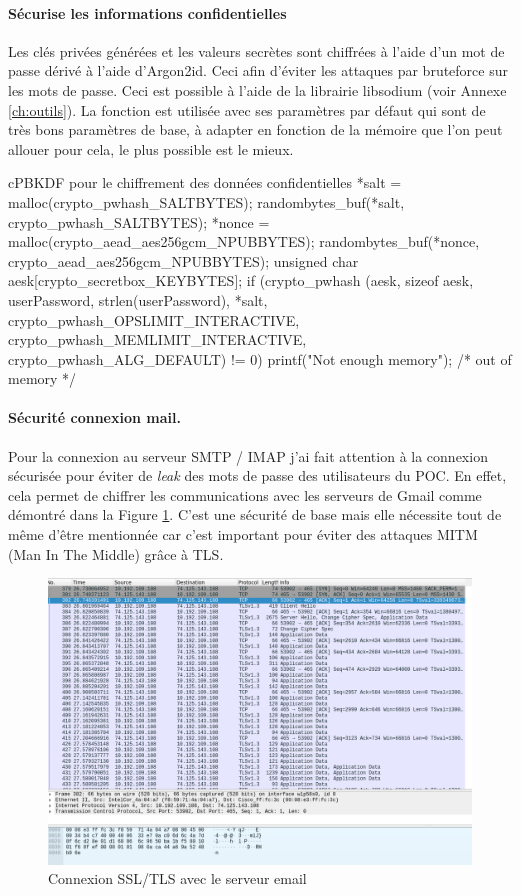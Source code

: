 \paragraph*{Sécurise les informations confidentielles}
Les clés privées générées et les valeurs secrètes sont chiffrées à l'aide d'un mot de passe dérivé à l'aide d'Argon2id. Ceci afin d'éviter les attaques par bruteforce sur les mots de passe. Ceci est possible à l'aide de la librairie libsodium (voir Annexe \ref{ch:outils}). La fonction est utilisée avec ses paramètres par défaut qui sont de très bons paramètres de base, à adapter en fonction de la mémoire que l'on peut allouer pour cela, le plus possible est le mieux.
\begin{sourcebox}{c}{PBKDF pour le chiffrement des données confidentielles}
	*salt = malloc(crypto_pwhash_SALTBYTES);
	randombytes_buf(*salt, crypto_pwhash_SALTBYTES);
	*nonce = malloc(crypto_aead_aes256gcm_NPUBBYTES);
	randombytes_buf(*nonce, crypto_aead_aes256gcm_NPUBBYTES);
	unsigned char aesk[crypto_secretbox_KEYBYTES];
	if (crypto_pwhash
	(aesk, sizeof aesk, userPassword, strlen(userPassword), *salt,
	crypto_pwhash_OPSLIMIT_INTERACTIVE, crypto_pwhash_MEMLIMIT_INTERACTIVE,
	crypto_pwhash_ALG_DEFAULT) != 0) {
		printf("Not enough memory");
		/* out of memory */
	}
\end{sourcebox}
\paragraph*{Sécurité connexion mail.}
Pour la connexion au serveur SMTP / IMAP j'ai fait attention à la connexion sécurisée pour éviter de \textit{leak} des mots de passe des utilisateurs du POC. En effet, cela permet de chiffrer les communications avec les serveurs de Gmail comme démontré dans la Figure \ref{fig:securityProofEmail}. C'est une sécurité de base mais elle nécessite tout de même d'être mentionnée car c'est important pour éviter des attaques MITM (Man In The Middle) grâce à TLS.
\begin{figure}[h!]
	\centering
	\includegraphics[width=14cm]{images/packetProofEncrypted.png}
	\caption{Connexion SSL/TLS avec le serveur email}
	\label{fig:securityProofEmail}
\end{figure}
